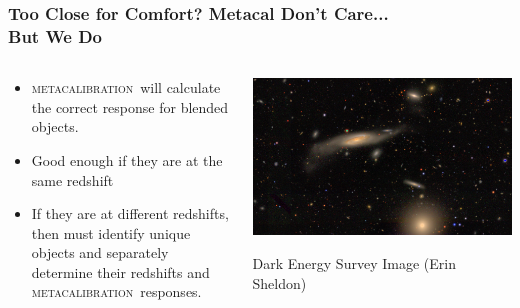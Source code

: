 \documentclass{beamer}
\newcommand{\mcal}{\textsc{metacalibration}}
\begin{document}
\frame
{
    \frametitle{Too Close for Comfort?  Metacal Don't Care... \\But We Do}
 
 
    \begin{columns}
        \begin{column}{0.5\textwidth}
            \begin{itemize}
                \item \mcal\ will calculate the correct response
                    for blended objects.
                \item Good enough if they are at the same redshift
                \item If they are at different redshifts, then must
                    identify unique objects and separately
                    determine their redshifts and \mcal\ responses.
            \end{itemize}
        \end{column}
        \begin{column}{0.5\textwidth}
            \begin{center}
                \includegraphics[width=\textwidth, angle=90]{DES0056-5248_gri_crop.jpg}
            \end{center}
                {\footnotesize Dark Energy Survey Image (Erin Sheldon)}
        \end{column}
    \end{columns}


}
\end{document}
